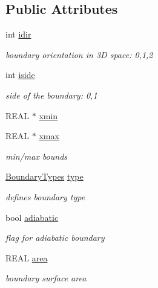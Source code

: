 \subsection*{Public Attributes}
\begin{CompactItemize}
\item 
int \hyperlink{structBoundary_509bdaf3fb8190c074a4d95ad12584ed}{idir}
\begin{CompactList}\small\item\em boundary orientation in 3D space: 0,1,2 \item\end{CompactList}\item 
int \hyperlink{structBoundary_e488ee304ed8d50941a4e8240582d815}{iside}
\begin{CompactList}\small\item\em side of the boundary: 0,1 \item\end{CompactList}\item 
REAL $\ast$ \hyperlink{structBoundary_fc9c689d9d8f675992fd68f91a4042a3}{xmin}
\item 
REAL $\ast$ \hyperlink{structBoundary_88c943adaa5964eca320bb392f242ee5}{xmax}
\begin{CompactList}\small\item\em min/max bounds \item\end{CompactList}\item 
\hyperlink{domain_8h_81abc9b219bae49710486f00fe2456fa}{BoundaryTypes} \hyperlink{structBoundary_5e45eab98ba76e52cf0cdc7518f1d78f}{type}
\begin{CompactList}\small\item\em defines boundary type \item\end{CompactList}\item 
bool \hyperlink{structBoundary_3d76841cd43b92d657c58ce7eec21248}{adiabatic}
\begin{CompactList}\small\item\em flag for adiabatic boundary \item\end{CompactList}\item 
REAL \hyperlink{structBoundary_2ebca8ebf70ee4a9be4ac3beb32d5be6}{area}
\begin{CompactList}\small\item\em boundary surface area \item\end{CompactList}\item 

\end{CompactItemize}
